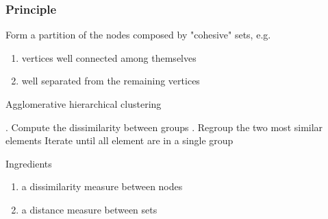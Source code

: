 \documentclass{beamer}\usepackage[]{graphicx}\usepackage[]{color}
\begin{document}
\begin{frame}
  \frametitle{Principle}

    Form a partition of the nodes composed by \alert{"cohesive"} sets, e.g.
    \begin{enumerate}
      \item vertices well connected among themselves
      \item well separated from the remaining vertices
    \end{enumerate}
  
  \begin{block}{Agglomerative hierarchical clustering}
  \vspace{-.25cm}
  \begin{algorithm}[H]
    \BlankLine\BlankLine
    . Compute the dissimilarity between groups . Regroup the two most similar elements \;
    \BlankLine  
      Iterate until all element are in a single group \;
    \BlankLine\BlankLine
  \end{algorithm}
  \end{block}
  
  \begin{block}{Ingredients}
    \begin{enumerate}
      \item a dissimilarity measure between nodes
      \item a distance measure between sets
    \end{enumerate}
  \end{block}

\end{frame}
\end{document}
